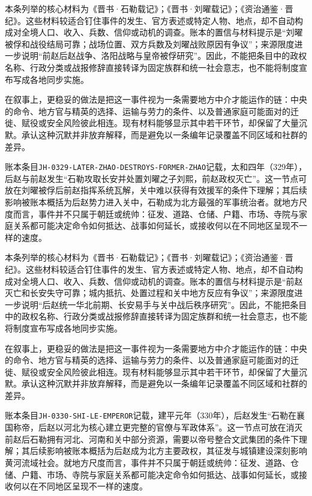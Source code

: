 本条列举的核心材料为《晋书·石勒载记》；《晋书·刘曜载记》；《资治通鉴·晋纪》。这些材料较适合钉住事件的发生、官方表述或特定人物、地点，却不自动构成对全境人口、收入、兵数、信仰或动机的调查。账本的置信与材料提示是“刘曜被俘和战役结局可靠；战场位置、双方兵数及刘曜战败原因有争议”；来源限度进一步说明“前赵后赵战争、洛阳战略与皇帝被俘研究”。因此，不能把条目中的政权名称、行政分类或战报修辞直接转译为固定族群和统一社会意志，也不能将制度宣布写成各地同步实施。

在叙事上，更稳妥的做法是把这一事件视为一条需要地方中介才能运作的链：中央的命令、地方官与精英的选择、运输与劳力的条件、以及普通家庭可能面对的迁徙、赋役或安全风险彼此相连。现有材料能够显示其中若干环节，却保留了大量沉默。承认这种沉默并非放弃解释，而是避免以一条编年记录覆盖不同区域和社群的差异。

账本条目\texttt{JH-0329-LATER-ZHAO-DESTROYS-FORMER-ZHAO}记载，太和四年（329年），后赵与前赵发生“石勒攻取长安并处置刘曜之子刘熙，前赵政权灭亡”。这一节点可放在刘曜被俘后前赵指挥系统瓦解，关中难以获得有效援军的条件下理解；其后续影响被账本概括为后赵势力进入关中，石勒成为北方最强的军事统治者。就地方尺度而言，事件并不只属于朝廷或统帅：征发、道路、仓储、户籍、市场、寺院与家庭关系都可能决定命令如何抵达、战事如何延长，或接收何以在不同地区呈现不一样的速度。

本条列举的核心材料为《晋书·石勒载记》；《晋书·刘曜载记》；《资治通鉴·晋纪》。这些材料较适合钉住事件的发生、官方表述或特定人物、地点，却不自动构成对全境人口、收入、兵数、信仰或动机的调查。账本的置信与材料提示是“前赵灭亡和长安失守可靠；城内抵抗、处置过程和关中地方反应有争议”；来源限度进一步说明“后赵统一华北前期、长安易手与关中战后秩序研究”。因此，不能把条目中的政权名称、行政分类或战报修辞直接转译为固定族群和统一社会意志，也不能将制度宣布写成各地同步实施。

在叙事上，更稳妥的做法是把这一事件视为一条需要地方中介才能运作的链：中央的命令、地方官与精英的选择、运输与劳力的条件、以及普通家庭可能面对的迁徙、赋役或安全风险彼此相连。现有材料能够显示其中若干环节，却保留了大量沉默。承认这种沉默并非放弃解释，而是避免以一条编年记录覆盖不同区域和社群的差异。

账本条目\texttt{JH-0330-SHI-LE-EMPEROR}记载，建平元年（330年），后赵发生“石勒在襄国称帝，后赵以河北为核心建立更完整的官僚与军政体系”。这一节点可放在消灭前赵后石勒拥有河北、河南和关中部分资源，需要以帝号整合文武集团的条件下理解；其后续影响被账本概括为后赵成为北方主要政权，其征发与城镇建设深刻影响黄河流域社会。就地方尺度而言，事件并不只属于朝廷或统帅：征发、道路、仓储、户籍、市场、寺院与家庭关系都可能决定命令如何抵达、战事如何延长，或接收何以在不同地区呈现不一样的速度。

